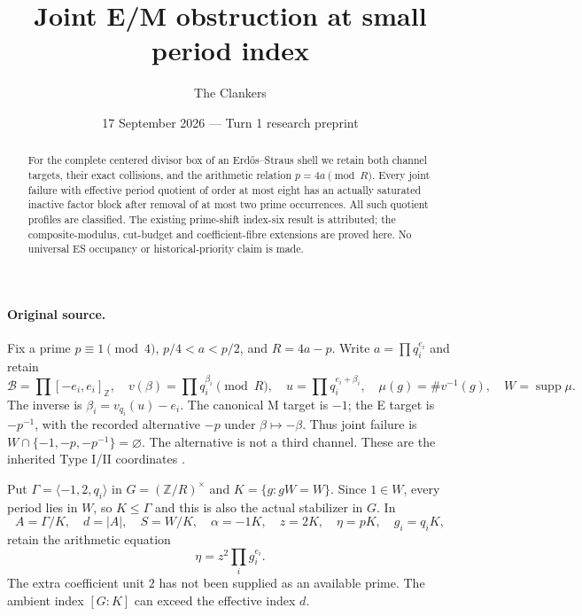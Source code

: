\documentclass[10pt,a4paper]{article}
\title{Joint E/M obstruction at small period index}
\author{The Clankers}
\date{17 September 2026 --- Turn 1 research preprint}
\begin{document}
\maketitle
\begin{abstract}
For the complete centered divisor box of an Erd\H{o}s--Straus shell we retain
both channel targets, their exact collisions, and the arithmetic relation
$p=4a\pmod R$. Every joint failure with effective period quotient of order at
most eight has an actually saturated inactive factor block after removal of
at most two prime occurrences. All such quotient profiles are classified.
The existing prime-shift index-six result is attributed; the composite-modulus,
cut-budget and coefficient-fibre extensions are proved here. No universal ES
occupancy or historical-priority claim is made.
\end{abstract}

\paragraph{Original source.}
Fix a prime $p\equiv1\pmod4$, $p/4<a<p/2$, and $R=4a-p$.
Write $a=\prod q_i^{e_i}$ and retain
\[
 \mathcal B=\prod[-e_i,e_i]_{\mathbb Z},\quad
 v(\beta)=\prod q_i^{\beta_i}\pmod R,\quad
 u=\prod q_i^{e_i+\beta_i},\quad
 \mu(g)=\#v^{-1}(g),\quad W=\operatorname{supp}\mu.
\]
The inverse is $\beta_i=v_{q_i}(u)-e_i$. The canonical M target is $-1$;
the E target is $-p^{-1}$, with the recorded alternative $-p$ under
$\beta\mapsto-\beta$. Thus joint failure is
$W\cap\{-1,-p,-p^{-1}\}=\varnothing$. The alternative is not a third channel.
These are the inherited Type I/II coordinates \cite{ET}.

Put $\Gamma=\langle-1,2,q_i\rangle$ in $G=(\mathbb Z/R)^\times$ and
$K=\{g:gW=W\}$. Since $1\in W$, every period lies in $W$, so $K\le\Gamma$
and this is also the actual stabilizer in $G$. In
\[
 A=\Gamma/K,\quad d=|A|,\quad S=W/K,\quad
 \alpha=-1K,\quad z=2K,\quad\eta=pK,\quad g_i=q_iK,
\]
retain the arithmetic equation
\[
 \boxed{\eta=z^2\prod_i g_i^{e_i}.}                       \tag{1}
\]
The extra coefficient unit $2$ has not been supplied as an available prime.
The ambient index $[G:K]$ can exceed the effective index $d$.
\end{document}
